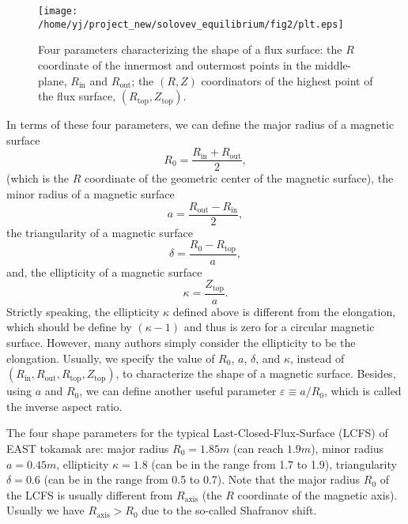 \documentclass{article}
\newcommand{\tmop}[1]{\ensuremath{\operatorname{#1}}}
\begin{document}
\begin{figure}[h]
  \texttt{[image: /home/yj/project\_new/solovev\_equilibrium/fig2/plt.eps]}
  \caption{\label{8-9-p1}Four parameters characterizing the shape of a flux
  surface: the $R$ coordinate of the innermost and outermost points in the
  middle-plane, $R_{\tmop{in}}$ and $R_{\tmop{out}}$; the $(R, Z)$
  coordinators of the highest point of the flux surface, $(R_{\tmop{top}},
  Z_{\tmop{top}})$.}
\end{figure}

In terms of these four parameters, we can define the major radius of a
magnetic surface
\begin{equation}
  \label{4-25-p1} R_0 = \frac{R_{\tmop{in}} + R_{\tmop{out}}}{2},
\end{equation}
(which is the $R$ coordinate of the geometric center of the magnetic surface),
the minor radius of a magnetic surface
\begin{equation}
  \label{4-25-p2} a = \frac{R_{\tmop{out}} - R_{\tmop{in}}}{2},
\end{equation}
the triangularity of a magnetic surface
\begin{equation}
  \label{4-25-p3} \delta = \frac{R_0 - R_{\tmop{top}}}{a},
\end{equation}
and, the ellipticity of a magnetic surface
\begin{equation}
  \label{4-25-p4} \kappa = \frac{Z_{\tmop{top}}}{a} .
\end{equation}
Strictly speaking, the ellipticity $\kappa$ defined above is different from
the elongation, which should be define by $(\kappa - 1)$ and thus is zero for
a circular magnetic surface. However, many authors simply consider the
ellipticity to be the elongation. Usually, we specify the value of $R_0$, $a$,
$\delta$, and $\kappa$, instead of $(R_{\tmop{in}}, R_{\tmop{out}},
R_{\tmop{top}}, Z_{\tmop{top}})$, to characterize the shape of a magnetic
surface. Besides, using $a$ and $R_0$, we can define another useful parameter
$\varepsilon \equiv a / R_0$, which is called the inverse aspect ratio.

The four shape parameters for the typical Last-Closed-Flux-Surface (LCFS) of
EAST tokamak are: major radius $R_0 = 1.85 m$ (can reach $1.9 m$), minor
radius $a = 0.45 m$, ellipticity $\kappa = 1.8$ (can be in the range from 1.7
to 1.9), triangularity $\delta = 0.6$ (can be in the range from 0.5 to 0.7).
Note that the major radius $R_0$ of the LCFS is usually different from
$R_{\tmop{axis}}$ (the $R$ coordinate of the magnetic axis). Usually we have
$R_{\tmop{axis}} > R_0$ due to the so-called Shafranov shift.
\end{document}
